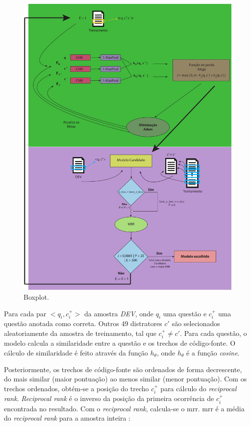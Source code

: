 \begin{figure}[h!]
\centering
\includegraphics[height=1.5\textwidth]{figuras/cap-experimento/evaluation_process.pdf}
\caption{Boxplot.} 
\label{fig:evaluation-process}
\end{figure}

Para cada par $<q_{i}, c_{i}^{+}>$ da amostra \emph{DEV}, onde $q_{i}$ uma questão e $c_{i}^{+}$ uma questão anotada como correta. Outros 49 distratores $c'$ são selecionados aleatoriamente da amostra de treinamento, tal que $c_{i}^{+} \neq c'$. Para cada questão, o modelo calcula a similaridade entre a questão e os trechos de código-fonte. O cálculo de similaridade é feito através da função $h_{\theta}$, onde $h_{\theta}$ é a função \textit{cosine}. 

Posteriormente, os trechos de código-fonte são ordenados de forma decrescente, do mais similar (maior pontuação) ao menos similar (menor pontuação). Com os trechos ordenados, obtém-se a posição do trecho $c_{i}^{+}$ para cálculo do \textit{reciprocal rank}. \textit{Reciprocal rank} é o inverso da posição da primeira ocorrência de $c_{i}^{+}$ encontrada no resultado. Com o \textit{reciprocal rank}, calcula-se o \acrshort{mrr}. \acrshort{mrr} é a média do \textit{reciprocal rank} para a amostra inteira \citep{Gu-deep-code-search:2018}:

